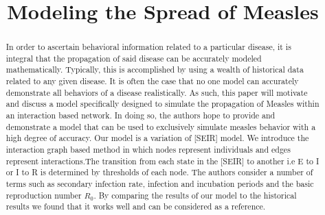 \documentclass[conference]{IEEEtran}
\begin{document}
\title{Modeling the Spread of Measles}

\author{
}
\maketitle



\begin{abstract} %
In order to ascertain behavioral information related to a particular disease, it is integral that the propagation of said disease can be accurately modeled mathematically. Typically, this is accomplished by using a wealth of historical data related to any given disease. It is often the case that no one model can accurately demonstrate all behaviors of a disease realistically. As such, this paper will motivate and discuss a model specifically designed to simulate the propagation of Measles within an interaction based network. In doing so, the authors hope to provide and demonstrate a model that can be used to exclusively simulate measles behavior with a high degree of accuracy. Our model is a variation of [SEIR] model. We introduce the interaction graph based method in which nodes represent individuals and edges represent interactions.The transition from each state in the [SEIR] to another i.e E to I or I to R is determined by thresholds of each node.
The authors consider a number of terms such as secondary infection rate, infection and incubation periods and the basic reproduction number $R_0$.
By comparing the results of our model to the historical results we found that it works well and can be considered as a reference.
\end{abstract}
\end{document}
